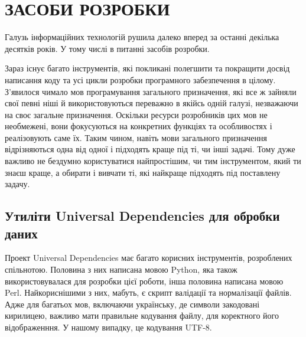 \section{ЗАСОБИ РОЗРОБКИ}
Галузь інформаційних технологій рушила далеко вперед за останні декілька десятків років.
У тому числі в питанні засобів розробки. 

Зараз існує багато інструментів, які покликані
полегшити та покращити досвід написання коду та усі цикли розробки програмного забезпечення
в цілому. З'явилося чимало мов програмування загального призначення,
які все ж зайняли свої певні ніші й використовуються переважно в якійсь одній галузі,
незважаючи на своє загальне призначення. Оскільки ресурси розробників цих мов не необмежені,
вони фокусуються на конкретних функціях та особливостях і реалізовують саме їх. Таким чином,
навіть мови загального призначення відрізняються одна від одної і підходять краще під ті,
чи інші задачі. Тому дуже важливо не бездумно користуватися найпростішим, чи тим інструментом,
який ти знаєш краще, а обирати і вивчати ті, які найкраще підходять під поставлену задачу.

\subsection{Утиліти Universal Dependencies для обробки даних}

Проект Universal Dependencies має багато корисних інструментів, розроблених спільнотою.
Половина з них написана мовою Python, яка також використовувалася для розробки цієї роботи, інша половина написана мовою Perl.
Найкориснішими з них, мабуть, є скрипт валідації та нормалізації
файлів. Адже для багатьох мов, включаючи українську, де символи закодовані
кирилицею, важливо мати правильне кодування файлу, для коректного його
відображенння. У нашому випадку, це кодування UTF-8.

